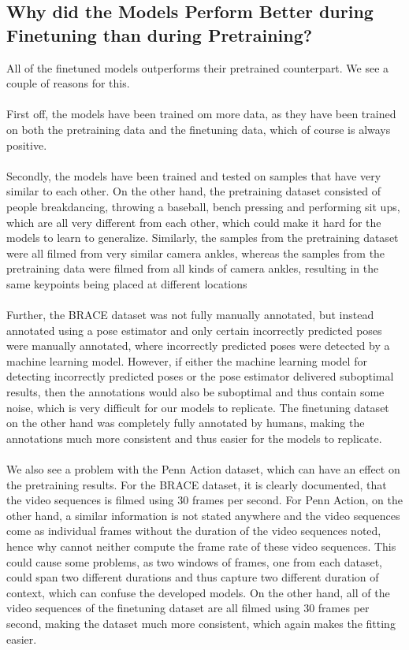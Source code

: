 \documentclass[./main.tex]{subfiles}
\begin{document}
\subsection{Why did the Models Perform Better during Finetuning than during Pretraining?}
All of the finetuned models outperforms their pretrained counterpart. We see a couple of reasons for this. 
\\
\\
First off, the models have been trained om more data, as they have been trained on both the pretraining data and the finetuning data, which of course is always positive.
\\
\\
Secondly, the models have been trained and tested on samples that have very similar to each other. On the other hand, the pretraining dataset consisted of people breakdancing, throwing a baseball, bench pressing and performing sit ups, which are all very different from each other, which could make it hard for the models to learn to generalize. Similarly, the samples from the pretraining dataset were all filmed from very similar camera ankles, whereas the samples from the pretraining data were filmed from all kinds of camera ankles, resulting in the same keypoints being placed at different locations
\\
\\
Further, the BRACE dataset was not fully manually annotated, but instead annotated using a pose estimator and only certain incorrectly predicted poses were manually annotated, where incorrectly predicted poses were detected by a machine learning model. However, if either the machine learning model for detecting incorrectly predicted poses or the pose estimator delivered suboptimal results, then the annotations would also be suboptimal and thus contain some noise, which is very difficult for our models to replicate. The finetuning dataset on the other hand was completely fully annotated by humans, making the annotations much more consistent and thus easier for the models to replicate.
\\
\\
We also see a problem with the Penn Action dataset, which can have an effect on the pretraining results. For the BRACE dataset, it is clearly documented, that the video sequences is filmed using 30 frames per second. For Penn Action, on the other hand, a similar information is not stated anywhere and the video sequences come as individual frames without the duration of the video sequences noted, hence why cannot neither compute the frame rate of these video sequences. This could cause some problems, as two windows of frames, one from each dataset, could span two different durations and thus capture two different duration of context, which can confuse the developed models. On the other hand, all of the video sequences of the finetuning dataset are all filmed using 30 frames per second, making the dataset much more consistent, which again makes the fitting easier.
\end{document}
